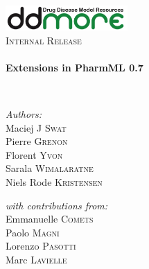 \begin{titlepage}
\begin{center}

\includegraphics[width=0.35\textwidth]{./logo/ddmore_logo}~\\[1cm]

%
\textsc{\Large Internal Release}\\[0.5cm]

\HRule \\[0.4cm]
{ \huge \bfseries Extensions in PharmML 0.7 \\[0.4cm] }

\HRule \\[1.5cm]

\begin{minipage}{0.5\textwidth}
\begin{flushleft} \large
\emph{Authors:}\\
Maciej J \textsc{Swat}\\
Pierre \textsc{Grenon}\\
Florent \textsc{Yvon}\\
Sarala \textsc{Wimalaratne}\\
Niels Rode \textsc{Kristensen}\\
\end{flushleft}
\end{minipage}
\begin{minipage}{0.4\textwidth}
\begin{flushright} \large
\emph{with contributions from:} \\
Emmanuelle \textsc{Comets}\\
Paolo \textsc{Magni}\\
Lorenzo \textsc{Pasotti}\\
Marc \textsc{Lavielle}
\end{flushright}
\end{minipage}


\end{center}
\end{titlepage}
